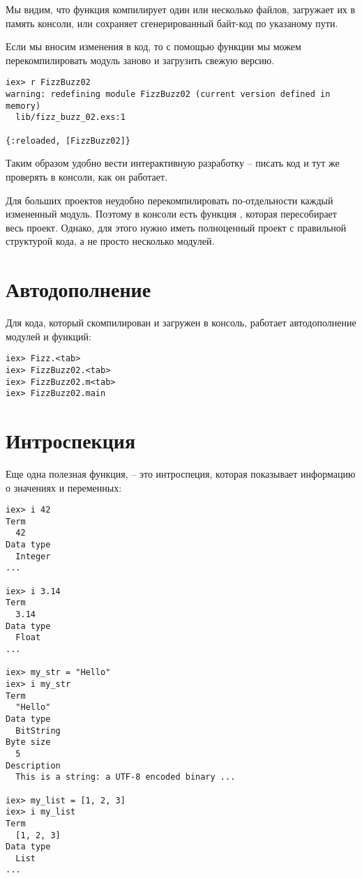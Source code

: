 Мы видим, что функция  компилирует один или несколько файлов, загружает их в память консоли, или сохраняет сгенерированный байт-код по указаному пути.

Если мы вносим изменения в код, то с помощью функции  мы можем перекомпилировать модуль заново и загрузить свежую версию.

\begin{lstlisting}[language=ElixirShell, style=elixir-shell]
iex> r FizzBuzz02
warning: redefining module FizzBuzz02 (current version defined in memory)
  lib/fizz_buzz_02.exs:1

{:reloaded, [FizzBuzz02]}
\end{lstlisting}

Таким образом удобно вести интерактивную разработку -- писать код и тут же проверять в консоли, как он работает.

Для больших проектов неудобно перекомпилировать по-отдельности каждый измененный модуль. Поэтому в консоли есть функция , которая пересобирает весь проект. Однако, для этого нужно иметь полноценный проект с правильной структурой кода, а не просто несколько модулей.

\section{Автодополнение}

Для кода, который скомпилирован и загружен в консоль, работает автодополнение модулей и функций:

\begin{lstlisting}[language=ElixirShell, style=elixir-shell]
iex> Fizz.<tab>
iex> FizzBuzz02.<tab>
iex> FizzBuzz02.m<tab>
iex> FizzBuzz02.main
\end{lstlisting}

\section{Интроспекция}

Еще одна полезная функция,  -- это интроспеция, которая показывает информацию о значениях и переменных:

\begin{lstlisting}[language=ElixirShell, style=elixir-shell]
iex> i 42
Term
  42
Data type
  Integer
...

iex> i 3.14
Term
  3.14
Data type
  Float
...

iex> my_str = "Hello"
iex> i my_str
Term
  "Hello"
Data type
  BitString
Byte size
  5
Description
  This is a string: a UTF-8 encoded binary ...

iex> my_list = [1, 2, 3]
iex> i my_list
Term
  [1, 2, 3]
Data type
  List
...
\end{lstlisting}

